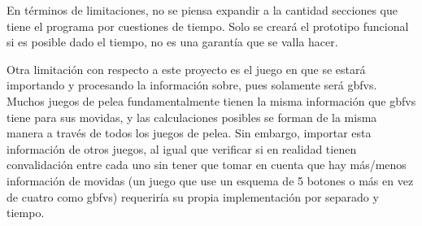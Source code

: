 En términos de limitaciones, no se piensa expandir a la cantidad secciones que tiene el programa por cuestiones de tiempo. Solo se creará el prototipo funcional si es posible dado el tiempo, no es una garantía que se valla hacer.

Otra limitación con respecto a este proyecto es el juego en que se estará importando y procesando la información sobre, pues solamente será \gls{gbfvs}. Muchos juegos de pelea fundamentalmente tienen la misma información que \gls{gbfvs} tiene para sus movidas, y las calculaciones posibles se forman de la misma manera a través de todos los juegos de pelea. Sin embargo, importar esta información de otros juegos, al igual que verificar si en realidad tienen convalidación entre cada uno sin tener que tomar en cuenta que hay más/menos información de movidas (un juego que use un esquema de 5 botones o más en vez de cuatro como \gls{gbfvs}) requeriría su propia implementación por separado y tiempo. 
